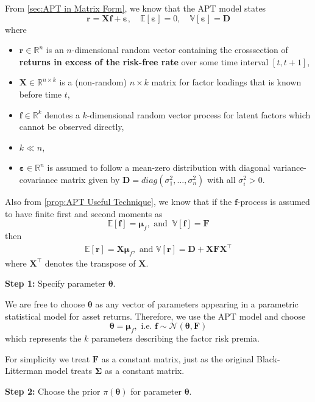 \documentclass[13pt]{article}
\theoremstyle{definition}
\theoremstyle{remark}
\begin{document}
From \cref{sec:APT in Matrix Form}, we know that the APT model states
$$
\bm{r}=\mathbf{X} \bm{f}+\bm{\varepsilon}, \quad \mathbb{E}[\bm{\varepsilon}]=0, \quad \mathbb{V}[\bm{\varepsilon}]=\mathbf{D}
$$
where 
\begin{itemize}
    \item $\bm{r} \in \mathbb{R}^{n}$ is an $n$-dimensional random vector containing the crosssection of \textbf{returns in excess of the risk-free rate} over some time interval $[t, t+1]$,
    \item $\mathbf{X} \in \mathbb{R}^{n\times k}$ is a (non-random) $n \times k$ matrix for factor loadings that is known before time $t$,
    \item $\bm{f} \in \mathbb{R}^{k}$ denotes a $k$-dimensional random vector process for latent factors which cannot be observed directly,
    \item $k \ll n$,
    \item $\bm{\varepsilon} \in \mathbb{R}^{n}$ is assumed to follow a mean-zero distribution with diagonal variance-covariance matrix given by $\mathbf{D}=diag\left(\sigma_1^2, \ldots, \sigma_n^2\right)$ with all $\sigma_i^2>0$.
\end{itemize}  

Also from \cref{prop:APT Useful Technique}, we know that if the $\bm{f}$-process is assumed to have finite first and second moments as 
$$
\mathbb{E}[\bm{f}]=\boldsymbol{\mu}_f, \text { and } ~\mathbb{V}[\bm{f}]=\mathbf{F}
$$
then 
\begin{align}
    \mathbb{E}[\bm{r}]=\mathbf{X} \boldsymbol{\mu}_f, \text{ and } \mathbb{V}[\bm{r}]=\mathbf{D}+\mathbf{X} \mathbf{F} \mathbf{X}^{\top}
\end{align}
where $\mathbf{X}^{\top}$ denotes the transpose of $\mathbf{X}$. 

{\color{C6}\textbf{Step 1:} Specify parameter $\bm{\theta}$.}

We are free to choose $\boldsymbol{\theta}$ as any vector of parameters appearing in a parametric statistical model for asset returns. Therefore, we use the APT model and choose 
\[
\boldsymbol{\theta}=\boldsymbol{\mu}_f, \text{ i.e. } \bm{f} \sim \mathcal{N}\left(\bm{\theta}, \mathbf{F}\right)
\]
which represents the $k$ parameters describing the factor risk premia.

For simplicity we treat $\mathbf{F}$ as a constant matrix, just as the original Black-Litterman model treats $\mathbf{\Sigma}$ as a constant matrix.


{\color{C6}\textbf{Step 2:} Choose the prior $\pi(\bm{\theta})$ for parameter $\bm{\theta}$.}
\end{document}
